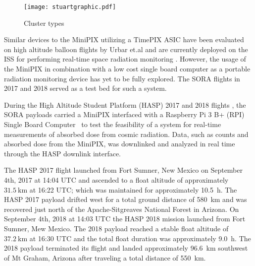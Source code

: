 \begin{figure}[H]
\centering
\texttt{[image: stuartgraphic.pdf]}
\caption{Cluster types\cite{stuartalgo}} %
\label{fig:stuartfigure}
\end{figure}

Similar devices to the MiniPIX utilizing a TimePIX ASIC have been evaluated on high altitude balloon flights by Urbar et.al \cite{bexus} and are currently deployed on the ISS for performing real-time space radiation monitoring \cite{timepixiss}. However, the usage of the MiniPIX in combination with a low cost single board computer as a portable radiation monitoring device has yet to be fully explored. The SORA flights in 2017 and 2018 served as a test bed for such a system.

%

During the High Altitude Student Platform (HASP) 2017 and 2018 flights \cite{hasp}, the SORA payloads carried a MiniPIX interfaced with a Raspberry Pi 3 B+ (RPI) Single Board Computer~\cite{rpi} to test the feasibility of a system for real-time measurements of absorbed dose from cosmic radiation. Data, such as counts and absorbed dose from the MiniPIX, was downlinked and analyzed in real time through the HASP downlink interface. 

The HASP 2017 flight launched from Fort Sumner, New Mexico on September 4th, 2017 at 14:04 UTC and ascended to a float altitude of approximately $\SI{31.5}{\kilo\meter}$ at 16:22 UTC; which was maintained for approximately \SI{10.5}{\hour}. The HASP 2017 payload drifted west for a total ground distance of \SI{580}{\kilo\meter} and was recovered just north of the Apache-Sitgreaves National Forest in Arizona.  On September 4th, 2018 at 14:03 UTC the HASP 2018 mission launched from Fort Sumner, Mew Mexico.  The 2018 payload reached a stable float altitude of $\SI{37.2}{\kilo\meter}$ at 16:30 UTC and the total float duration was approximately \SI{9.0}{\hour}. The 2018 payload terminated its flight and landed approximately \SI{96.6}{\kilo\meter} southwest of Mt Graham, Arizona after traveling a total distance of \SI{550}{\kilo\meter}.

